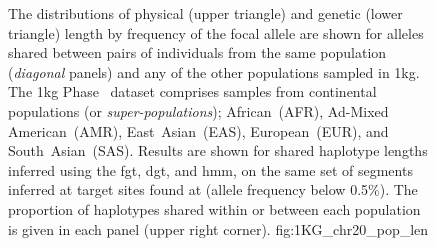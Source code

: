 

\begin{figure}[p]
\centering
{}
{The distributions of physical (upper triangle) and genetic (lower triangle) length by frequency of the focal allele are shown for alleles shared between pairs of individuals from the same population (\emph{diagonal} panels) and any of the other populations sampled in \gls{1kg}.
The \gls{1kg} Phase~ dataset comprises samples from  continental populations (or \emph{super-populations});
African~(AFR), Ad-Mixed American~(AMR), East~Asian~(EAS), European~(EUR), and South~Asian~(SAS).
Results are shown for shared haplotype lengths inferred using the \gls{fgt}, \gls{dgt}, and \gls{hmm}, on the same set of segments inferred at target sites found at \fk{[2,25]} (\ie allele frequency below 0.5\%).
The proportion of haplotypes shared within or between each population is given in each panel (upper right corner).}
{fig:1KG_chr20_pop_len}
\end{figure}
